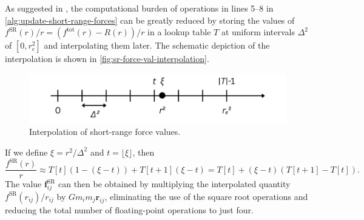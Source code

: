 As suggested in \cite{Hockney1988}, the computational burden of operations in lines 5--8 in \autoref{alg:update-short-range-forces} can be greatly reduced by storing the values of $f^\text{SR}(r) / r = (f^\text{tot}(r) - R(r)) / r$ in a lookup table $T$ at uniform intervals $\Delta^2$ of $[0, r_e^2]$ and interpolating them later.
The schematic depiction of the interpolation is shown in \autoref{fig:sr-force-val-interpolation}.
\begin{figure}[htp]
    \centering
    \includegraphics[scale=0.2]{img/interpolation.png}
    \caption{Interpolation of short-range force values.}
    \label{fig:sr-force-val-interpolation}
\end{figure}
If we define $\xi = r^2 / \Delta^2$ and $t=\lfloor \xi \rfloor$, then
\begin{equation*}
    \frac{f^\text{SR}(r)}{r} \approx T[t]\left(1 - (\xi - t)\right) + T[t+1](\xi - t)
    = T[t] + (\xi - t) (T[t+1] - T[t]).
\end{equation*}
The value $\mathbf{f}^\text{SR}_{ij}$ can then be obtained by multiplying the interpolated quantity $f^\text{SR}(r_{ij})/r_{ij}$ by $G m_i m_j \mathbf{r}_{ij}$, eliminating the use of the square root operations and reducing the total number of floating-point operations to just four.

